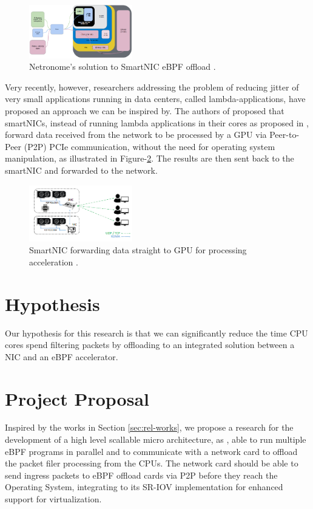 \documentclass[conference]{IEEEtran}
\begin{document}
\begin{figure}[ht]
    \centering
    \includegraphics[width=0.4\textwidth]{figures/ebpf_offload.png}
    \caption{Netronome's solution to SmartNIC eBPF offload \cite{beckett:2018:ebpf-xdp}.}
    \label{fig:ebpf-offload}
\end{figure}

Very recently, however, researchers addressing the problem of reducing jitter of very small applications running in data centers, called lambda-applications, have proposed an approach we can be inspired by. The authors of \cite{tork:2020:lynx} proposed that smartNICs, instead of running lambda applications in their cores as proposed in \cite{choi:2019:lambda-nic}, forward data received from the network to be processed by a GPU via Peer-to-Peer (P2P) PCIe communication, without the need for operating system manipulation, as illustrated in Figure-\ref{fig:lynx}. The results are then sent back to the smartNIC and forwarded to the network.

\begin{figure}[ht]
    \centering
    \includegraphics[width=0.4\textwidth]{figures/linx.png}
    \caption{SmartNIC forwarding data straight to GPU for processing acceleration \cite{tork:2020:lynx}.}
    \label{fig:lynx}
\end{figure}

\section{Hypothesis}
Our hypothesis for this research is that we can significantly reduce the time CPU cores spend filtering packets by offloading to an integrated solution between a NIC and an eBPF accelerator.

\section{Project Proposal}
Inspired by the works in Section \ref{sec:rel-works}, we propose a research for the development of a high level scallable micro architecture, as \cite{ankit2019puma}, able to run multiple eBPF programs in parallel and to communicate with a network card to offload the packet filer processing from the CPUs. The network card should be able to send ingress packets to eBPF offload cards via P2P before they reach the Operating System, integrating to its SR-IOV implementation for enhanced support for virtualization.
\end{document}

